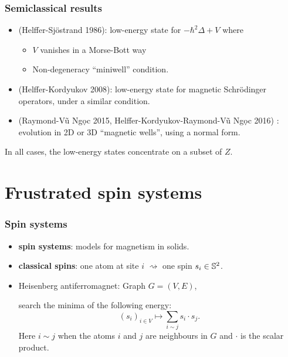 \documentclass[mathserif]{beamer}
\begin{document}
        \begin{frame}
          \frametitle{Semiclassical results}
          \begin{itemize}
          \item (Helffer-Sjöstrand 1986): low-energy state for
            $-\hbar^2\Delta+V$ where
            \begin{itemize}
            \item $V$ vanishes in a Morse-Bott way
            \item Non-degeneracy ``miniwell'' condition.
            \end{itemize}
            \item<2-> (Helffer-Kordyukov 2008): low-energy state for
              magnetic Schrödinger operators, under a similar
              condition.
              \item<3> (Raymond-Vũ Ng\d{o}c 2015,
                Helffer-Kordyukov-Raymond-Vũ Ng\d{o}c 2016) :
                evolution in 2D or 3D ``magnetic wells'', using a
                {\color{myorange} normal form}.
              \end{itemize}
              In all cases, the low-energy states concentrate on a
              subset of $Z$.
        \end{frame}

\section{Frustrated spin systems}

\begin{frame}
  \frametitle{Spin systems}
  \begin{itemize}
  \item<1-> {\bfseries spin systems}: models for magnetism in solids.
  \item<2-> {\bfseries classical spins}: one atom at site $i$
    $\rightsquigarrow$ one spin $s_i\in \S^2$.
  \item<3> Heisenberg antiferromagnet: Graph $G=(V,E)$,
    
    search the minima of the following energy:
    \[
      (s_i)_{i\in V}\mapsto\sum_{i\sim j}s_i\cdot s_j.
    \]
    Here $i\sim j$ when the atoms $i$ and $j$ are neighbours in $G$
    and $\cdot$ is the scalar product.
  \end{itemize}
\end{frame}
\end{document}
